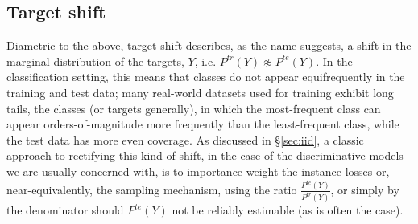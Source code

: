 \subsection{Target shift}\label{ssec:label-shift}
Diametric to the above, target shift describes, as the name suggests, a shift in the
marginal distribution of the targets, \(Y\), i.e. \( P^{tr}(Y) \not\approx P^{te}(Y) \).
%
In the classification setting, this means that classes do not appear equifrequently in the training
and test data; many real-world datasets used for training exhibit long tails, \wrt{} the classes
(or targets generally), in which the most-frequent class can appear orders-of-magnitude more
frequently than the least-frequent class, while the test data has more even coverage.
%
As discussed in \S\ref{sec:iid}, a classic approach to rectifying this kind of shift, in the case of
the discriminative models we are usually concerned with, is to  importance-weight the instance
losses or, near-equivalently, the sampling mechanism, using the ratio \(\frac{P^{te}(Y)}{P^{tr}(Y)}
\), or simply by the denominator should \( P^{te}(Y)\) not be reliably estimable (as is often the
case).
%
%
